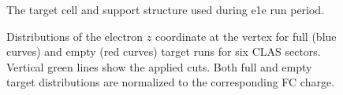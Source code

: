\begin{figure}[htp]
\begin{center}
\caption{\small The target cell and support structure used during e1e run period. \label{fig:vertex_cut_e1etarget}}
\end{center}
\end{figure}

\begin{figure}[htp]
\begin{center}
\caption{\small Distributions of the electron $z$ coordinate at the vertex for full (blue curves) and empty (red curves) target runs for six CLAS sectors. Vertical green lines show the applied cuts. Both full and empty target distributions are normalized to the corresponding FC charge. \label{fig:vertex_cut_empty}}
\end{center}
\end{figure}

